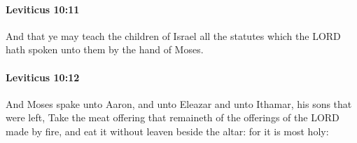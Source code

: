 		\paragraph{Leviticus 10:11} %
			\label{LEVITICUS-10-11}

			And that ye may teach the children of Israel all the statutes which the LORD hath spoken unto them by the hand of Moses.


		\paragraph{Leviticus 10:12} %
			\label{LEVITICUS-10-12}

			And Moses spake unto Aaron, and unto Eleazar and unto Ithamar, his sons that were left, Take the meat offering that remaineth of the offerings of the LORD made by fire, and eat it without leaven beside the altar: for it is most holy:

